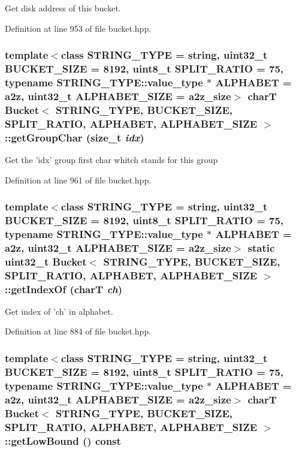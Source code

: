 Get disk address of this bucket. 

Definition at line 953 of file bucket.hpp.\hypertarget{classBucket_17e0be9a920b5a61c1eb69d044bedd03}{
\subsubsection[{getGroupChar}]{\setlength{\rightskip}{0pt plus 5cm}template$<$class STRING\_\-TYPE  = string, uint32\_\-t BUCKET\_\-SIZE = 8192, uint8\_\-t SPLIT\_\-RATIO = 75, typename STRING\_\-TYPE::value\_\-type $\ast$ ALPHABET = a2z, uint32\_\-t ALPHABET\_\-SIZE = a2z\_\-size$>$ charT {\bf Bucket}$<$ STRING\_\-TYPE, BUCKET\_\-SIZE, SPLIT\_\-RATIO, ALPHABET, ALPHABET\_\-SIZE $>$::getGroupChar (size\_\-t {\em idx})}}
\label{classBucket_17e0be9a920b5a61c1eb69d044bedd03}


Get the 'idx' group first char whitch stands for this group 

Definition at line 961 of file bucket.hpp.\hypertarget{classBucket_8c5caaa48ffdbaa747ccfa03a102ed52}{
\subsubsection[{getIndexOf}]{\setlength{\rightskip}{0pt plus 5cm}template$<$class STRING\_\-TYPE  = string, uint32\_\-t BUCKET\_\-SIZE = 8192, uint8\_\-t SPLIT\_\-RATIO = 75, typename STRING\_\-TYPE::value\_\-type $\ast$ ALPHABET = a2z, uint32\_\-t ALPHABET\_\-SIZE = a2z\_\-size$>$ static uint32\_\-t {\bf Bucket}$<$ STRING\_\-TYPE, BUCKET\_\-SIZE, SPLIT\_\-RATIO, ALPHABET, ALPHABET\_\-SIZE $>$::getIndexOf (charT {\em ch})}}
\label{classBucket_8c5caaa48ffdbaa747ccfa03a102ed52}


Get index of 'ch' in alphabet. 

Definition at line 884 of file bucket.hpp.\hypertarget{classBucket_cf5d42452cf0850e1455a8bc8d890c96}{
\subsubsection[{getLowBound}]{\setlength{\rightskip}{0pt plus 5cm}template$<$class STRING\_\-TYPE  = string, uint32\_\-t BUCKET\_\-SIZE = 8192, uint8\_\-t SPLIT\_\-RATIO = 75, typename STRING\_\-TYPE::value\_\-type $\ast$ ALPHABET = a2z, uint32\_\-t ALPHABET\_\-SIZE = a2z\_\-size$>$ charT {\bf Bucket}$<$ STRING\_\-TYPE, BUCKET\_\-SIZE, SPLIT\_\-RATIO, ALPHABET, ALPHABET\_\-SIZE $>$::getLowBound () const}}
\label{classBucket_cf5d42452cf0850e1455a8bc8d890c96}


